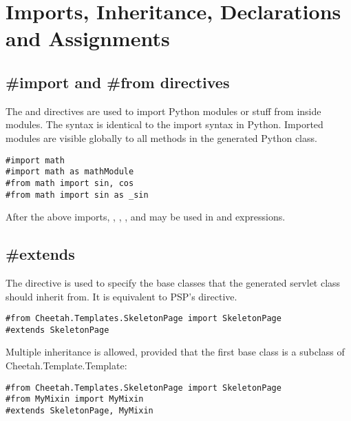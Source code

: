 \section{Imports, Inheritance, Declarations and Assignments}
\label{inheritanceEtc}


\subsection{\#import and \#from directives}
\label{inheritanceEtc.import}

The  and  directives are used to import Python
modules or stuff from inside modules.  The syntax is identical to the import
syntax in Python.  Imported modules are visible globally to all methods in the
generated Python class.

\begin{verbatim}
#import math
#import math as mathModule
#from math import sin, cos
#from math import sin as _sin
\end{verbatim}

After the above imports, , , 
,  and  may be used in 
 and expressions.

\subsection{\#extends}
\label{inheritanceEtc.extends}

The  directive is used to specify the base classes that the
generated servlet class should inherit from.  It is equivalent to PSP's
 directive.

\begin{verbatim}
#from Cheetah.Templates.SkeletonPage import SkeletonPage
#extends SkeletonPage
\end{verbatim}

Multiple inheritance is allowed, provided that the first base class is a
subclass of Cheetah.Template.Template:

\begin{verbatim}
#from Cheetah.Templates.SkeletonPage import SkeletonPage
#from MyMixin import MyMixin
#extends SkeletonPage, MyMixin
\end{verbatim}


